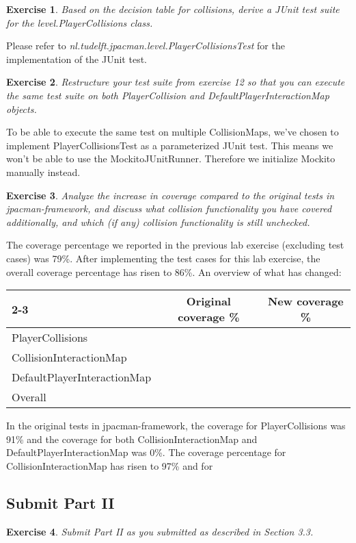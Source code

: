 \documentclass[a4paper]{article}
\newtheorem{thm}{Exercise}
\begin{document}
    \begin{thm}
      Based on the decision table for collisions, derive a JUnit test suite for the
      level.PlayerCollisions class.
    \end{thm}
    Please refer to \textit{nl.tudelft.jpacman.level.PlayerCollisionsTest} for the implementation of the JUnit test.

    \begin{thm}
      Restructure your test suite from exercise 12 so that you can execute the same test
      suite on both PlayerCollision and DefaultPlayerInteractionMap objects.
    \end{thm}
    To be able to execute the same test on multiple CollisionMaps, we've chosen to implement PlayerCollisionsTest as a parameterized JUnit test.
    This means we won't be able to use the MockitoJUnitRunner. Therefore we initialize Mockito manually instead.
    
    \begin{thm}
      Analyze the increase in coverage compared to the original tests in jpacman-framework,
      and discuss what collision functionality you have covered additionally,
      and which (if any) collision functionality is still unchecked.
    \end{thm}
    
    The coverage percentage we reported in the previous lab exercise (excluding test cases) was 79\%.
    After implementing the test cases for this lab exercise, the overall coverage percentage has risen to 86\%.
    An overview of what has changed:
    \begin{table}[h]
      \begin{tabular}{|l|c|c|}
        \cline{2-3}
        \multicolumn{1}{}{}		& Original coverage \%	& New coverage \%	\\ \hline
        PlayerCollisions		&			&			\\ \hline
        CollisionInteractionMap		&			&			\\ \hline
        DefaultPlayerInteractionMap	&			&			\\ \hline
        Overall				&			&			\\ \hline
      \end{tabular}
    \end{table}
    
        In the original tests in jpacman-framework, the coverage for PlayerCollisions was 91\% and
    the coverage for both CollisionInteractionMap and DefaultPlayerInteractionMap was 0\%.
    The coverage percentage for CollisionInteractionMap has risen to 97\% and for 
  
  \subsection{Submit Part II}
    \begin{thm}
      Submit Part II as you submitted as described in Section 3.3.
    \end{thm}
\end{document}
